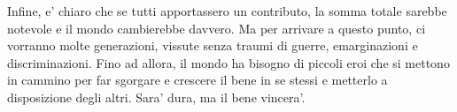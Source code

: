 Infine, e' chiaro che se tutti apportassero un contributo, la somma totale sarebbe notevole e il mondo cambierebbe davvero. Ma per arrivare a questo punto, ci vorranno molte generazioni, vissute senza traumi di guerre, emarginazioni e discriminazioni. Fino ad allora, il mondo ha bisogno di piccoli eroi che si mettono in cammino per far sgorgare e crescere il bene in se stessi e metterlo a disposizione degli altri. Sara' dura, ma il bene vincera'.

